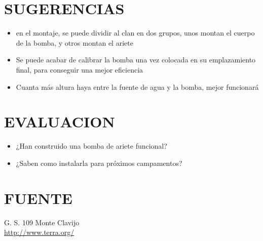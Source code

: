\documentclass[10pt]{article}
\newlength{\w}
\begin{document}
\section{SUGERENCIAS}
\begin{itemize}
\item en el montaje, se puede dividir al clan en dos grupos, unos montan el cuerpo de la bomba,
y otros montan el ariete
\item Se puede acabar de calibrar la bomba una vez colocada en su emplazamiento final, para
conseguir una mejor eficiencia
\item Cuanta m\'as altura haya entre la fuente de agua y la bomba, mejor funcionar\'a
\end{itemize}
\section{EVALUACION}
\begin{itemize}
\item ¿Han construido una bomba de ariete funcional?
\item ¿Saben como instalarla para pr\'oximos campamentos?
\end{itemize}
\section{FUENTE}
G. S. 109 Monte Clavijo
\\
{\color{blue} \url{http://www.terra.org/}}
\end{document}
